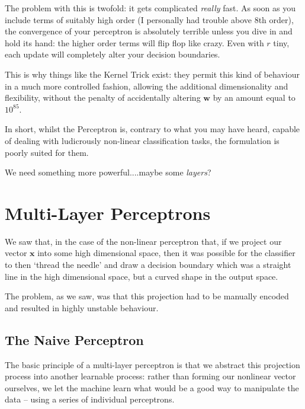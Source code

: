 \documentclass[a4paper,openany,11pt]{book}
\renewcommand\vec[1]{\boldsymbol{\mathbf{#1}}}
\begin{document}
				The problem with this is twofold: it gets complicated \textit{really} fast. As soon as you include terms of suitably high order (I personally had trouble above 8th order), the convergence of your perceptron is absolutely terrible unless you dive in and hold its hand: the higher order terms will flip flop like crazy. Even with $r$ tiny, each update will completely alter your decision boundaries. 

				This is why things like the Kernel Trick exist: they permit this kind of behaviour in a much more controlled fashion, allowing the additional dimensionality and flexibility, without the penalty of accidentally altering $\vec{w}$ by an amount equal to $10^{85}$.

				In short, whilst the Perceptron is, contrary to what you may have heard, capable of dealing with ludicrously non-linear classification tasks, the formulation is poorly suited for them. 
				
				We need something more powerful....maybe some \textit{layers}?

		\chapter{Multi-Layer Perceptrons}

			We saw that, in the case of the non-linear perceptron that, if we project our vector $\vec{x}$ into some high dimensional space, then it was possible for the classifier to then `thread the needle' and draw a decision boundary which was a straight line in the high dimensional space, but a curved shape in the output space. 

			The problem, as we saw, was that this projection had to be manually encoded and resulted in highly unstable behaviour. 
			
			\section{The Naive Perceptron}
				The basic principle of a multi-layer perceptron is that we abstract this projection process into another learnable process: rather than forming our nonlinear vector ourselves, we let the machine learn what would be a good way to manipulate the data -- using a series of individual perceptrons.
\end{document}

